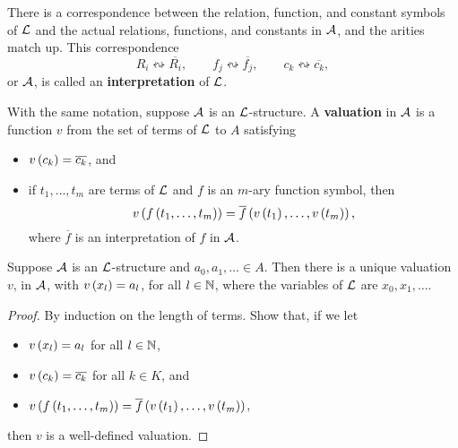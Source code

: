 There is a correspondence between the relation, function, and constant symbols of $ \LL $ and the actual relations, functions, and constants in $ \AA $, and the arities match up. This correspondence
$$ R_i \leftrightsquigarrow \overline{R_i}, \qquad f_j \leftrightsquigarrow \overline{f_j}, \qquad c_k \leftrightsquigarrow \overline{c_k}, $$
or $ \AA $, is called an \textbf{interpretation} of $ \LL $.

\begin{definition}
With the same notation, suppose $ \AA $ is an $ \LL $-structure. A \textbf{valuation} in $ \AA $ is a function $ v $ from the set of terms of $ \LL $ to $ A $ satisfying
\begin{itemize}
\item $ v\rb{c_k} = \overline{c_k} $, and
\item if $ t_1, \dots, t_m $ are terms of $ \LL $ and $ f $ is an $ m $-ary function symbol, then
$$ v\rb{f\rb{t_1, \dots, t_m}} = \overline{f}\rb{v\rb{t_1}, \dots, v\rb{t_m}}, $$
where $ \overline{f} $ is an interpretation of $ f $ in $ \AA $.
\end{itemize}
\end{definition}

\begin{lemma}
Suppose $ \AA $ is an $ \LL $-structure and $ a_0, a_1, \dots \in A $. Then there is a unique valuation $ v $, in $ \AA $, with $ v\rb{x_l} = a_l $, for all $ l \in \N $, where the variables of $ \LL $ are $ x_0, x_1, \dots $.
\end{lemma}

\begin{proof}
By induction on the length of terms. Show that, if we let
\begin{itemize}
\item $ v\rb{x_l} = a_l $ for all $ l \in \N $,
\item $ v\rb{c_k} = \overline{c_k} $ for all $ k \in K $, and
\item $ v\rb{f\rb{t_1, \dots, t_m}} = \overline{f}\rb{v\rb{t_1}, \dots, v\rb{t_m}} $,
\end{itemize}
then $ v $ is a well-defined valuation.
\end{proof}

